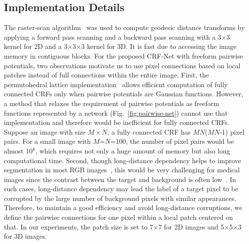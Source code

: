 \documentclass[10pt,journal,compsoc]{IEEEtran}
\begin{document}
\subsection{Implementation Details}\label{method:implementation}
The raster-scan algorithm~\cite{Criminisi2008} was used to compute geodesic distance transforms by applying a forward pass scanning and a backward pass scanning with a 3$\times$3 kernel for 2D and a 3$\times$3$\times$3 kernel for 3D.
It is fast due to accessing the image memory in contiguous blocks.
For the proposed CRF-Net with freeform pairwise potentials, two observations motivate us to use pixel connections based on local patches instead of full connections within the entire image. First, the permutohedral lattice implementation~\cite{Krahenbuhl2011, Zheng2015a} allows efficient computation of fully connected CRFs only when pairwise potentials are Gaussian functions. However, a method that relaxes the requirement of pairwise potentials as freeform functions represented by a network (Fig.~\ref{fig:pairwise-net}) cannot use that implementation and therefore would be inefficient for fully connected CRFs. Suppose an image with size $M\times N$, a fully connected CRF has $MN$($MN$-1) pixel pairs. For a small image with $M$=$N$=100, the number of pixel pairs would be almost 10$^8$, which requires not only a huge amount of memory but also long computational time. Second, though long-distance dependency helps to improve segmentation in most RGB images~\cite{Krahenbuhl2011, Zheng2015a, Chen2015iclr}, this would be very challenging for medical images since the contrast between the target and background is often low~\cite{Han2011ipmi}. In such cases, long-distance dependency may lead the label of a target pixel to be corrupted by the large number of background pixels with similar appearances. Therefore, to maintain a good efficiency and avoid long-distance corruptions, we define the pairwise connections for one pixel within a local patch centered on that. In our experiments, the patch size is set to 7$\times$7 for 2D images and 5$\times$5$\times$3 for 3D images.
\end{document}
